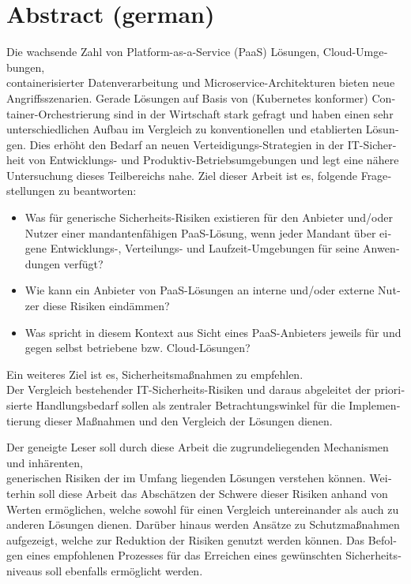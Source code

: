 \chapter*{Abstract (german)}
\thispagestyle{empty}
\begin{otherlanguage}{german}
Die wachsende Zahl von Platform-as-a-Service (PaaS) Lösungen, Cloud-Umgebungen, \\
containerisierter Datenverarbeitung und Microservice-Architekturen bieten neue Angriffsszenarien.
Gerade Lösungen auf Basis von (Kubernetes konformer) Container-Orchestrierung sind in der Wirtschaft stark gefragt und haben einen sehr unterschiedlichen Aufbau im Vergleich zu konventionellen und etablierten Lösungen.
Dies erhöht den Bedarf an neuen Verteidigungs-Strategien in der IT-Sicherheit von Entwicklungs- und Produktiv-Betriebsumgebungen und legt eine nähere Untersuchung dieses Teilbereichs nahe.
Ziel dieser Arbeit ist es, folgende Fragestellungen zu beantworten:

\begin{itemize}

\item Was für generische Sicherheits-Risiken existieren für den Anbieter und/oder Nutzer einer mandantenfähigen PaaS-Lösung, wenn jeder Mandant über eigene Entwicklungs-, Verteilungs- und Laufzeit-Umgebungen für seine Anwendungen verfügt?

\item Wie kann ein Anbieter von PaaS-Lösungen an interne und/oder externe Nutzer diese Risiken eindämmen?

\item Was spricht in diesem Kontext aus Sicht eines PaaS-Anbieters jeweils für und gegen selbst betriebene bzw. Cloud-Lösungen?

\end{itemize}

Ein weiteres Ziel ist es, Sicherheitsmaßnahmen zu empfehlen. \\
Der Vergleich bestehender IT-Sicherheits-Risiken und daraus abgeleitet der priorisierte Handlungsbedarf sollen als zentraler Betrachtungswinkel für die Implementierung dieser Maßnahmen und den Vergleich der Lösungen dienen. 

Der geneigte Leser soll durch diese Arbeit die zugrundeliegenden Mechanismen und inhärenten, \\
generischen Risiken der im Umfang liegenden Lösungen verstehen können.
Weiterhin soll diese Arbeit das Abschätzen der Schwere dieser Risiken anhand von Werten ermöglichen, welche sowohl für einen Vergleich untereinander als auch zu anderen Lösungen dienen. Darüber hinaus werden Ansätze zu Schutzmaßnahmen aufgezeigt, welche zur Reduktion der Risiken genutzt werden können. Das Befolgen eines empfohlenen Prozesses für das Erreichen eines gewünschten Sicherheitsniveaus soll ebenfalls ermöglicht werden.



\end{otherlanguage}
